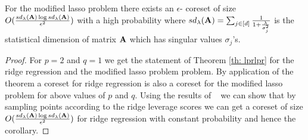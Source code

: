 

\begin{corollary}
	For the modified lasso problem there exists an $\epsilon$- coreset of size $O(\frac{sd_\lambda(\mathbf{A}) \log{sd_\lambda(\mathbf{A})}}{\epsilon^2})$ with a high probability where $sd_\lambda(\mathbf{A})=\sum_{j\in[d]}{\frac{1}{1+\frac{\lambda}{\sigma_j^2}}}$ is the statistical dimension of matrix $\mathbf{A}$ which has singular values $\sigma_j$'s.
\end{corollary}
\begin{proof}
    For $p=2$ and $q=1$ we get the statement of Theorem \ref{th: lprlpr} for the ridge regression and the modified lasso problem problem. By application of the theorem a coreset for ridge regression is also a coreset for the modified lasso problem for above values of $p$ and $q$. Using the results of ~\cite{avron2017sharper} we can show that by sampling points according to the ridge leverage scores we can get a coreset of size $O(\frac{sd_\lambda(\mathbf{A}) \log{sd_\lambda(\mathbf{A})}}{\epsilon^2})$  for ridge regression with constant probability and hence the corollary.
\end{proof}